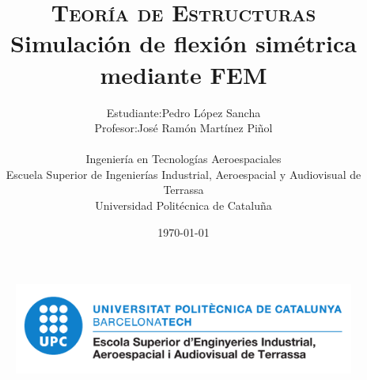 


\title{
    \Huge{\bfseries\scshape Teoría de Estructuras} \\
    \vspace{5mm}
    \Large{\textbf{Simulación de flexión simétrica mediante FEM}} \\
}

\author{
    {\fontsize{5pt}{14pt}
    \begin{tabular}{rl}
    	\vspace{4mm}
        Estudiante:     & Pedro López Sancha 			\\
        Profesor:  	    & José Ramón Martínez Piñol 	\\
    \end{tabular}
    \vspace{1cm} \\
    Ingeniería en Tecnologías Aeroespaciales \\
    \vspace{0.1cm}
    Escuela Superior de Ingenierías Industrial, Aeroespacial y Audiovisual de Terrassa \\
    \vspace{0.1cm}
    Universidad Politécnica de Cataluña \\
    \vspace{0.5cm}}
}

\date{\today}

\begin{titlepage}
	\vspace*{\fill}
    \begin{center}
        \thetitle
        \vspace{1cm}
        \large{\theauthor}
        \thedate
    \end{center}
	\begin{figure}[ht]
		\centering
		\includegraphics[width=0.6\linewidth]{figures/general/logo_eseiaat.pdf}
	\end{figure}
    \vspace*{\fill}
\end{titlepage}

\restoregeometry


